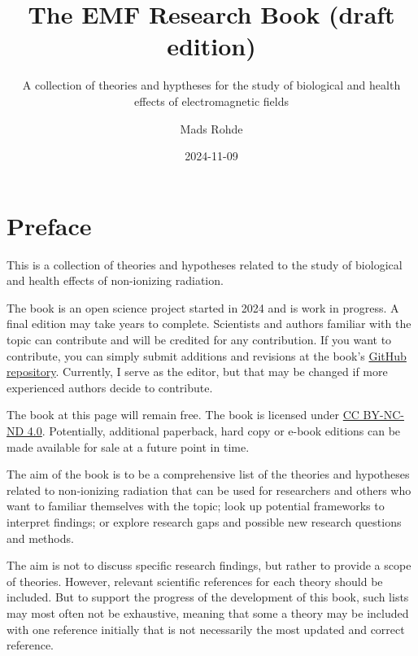 \documentclass[
  letterpaper,
  DIV=11,
  numbers=noendperiod]{scrreprt}
\title{The EMF Research Book (draft edition)}
\subtitle{A collection of theories and hyptheses for the study of
biological and health effects of electromagnetic fields}
\author{Mads Rohde}
\date{2024-11-09}
\renewcommand*\contentsname{Table of contents}
\newcommand\contentsname{Table of contents}
\begin{document}
\maketitle
\ifdefined\Shaded\renewenvironment{Shaded}{\begin{tcolorbox}[enhanced, sharp corners, boxrule=0pt, breakable, borderline west={3pt}{0pt}{shadecolor}, interior hidden, frame hidden]}{\end{tcolorbox}}\fi

\renewcommand*\contentsname{Table of contents}
{
\hypersetup{linkcolor=}
\setcounter{tocdepth}{2}
\tableofcontents
}

\hypertarget{preface}{%
\chapter*{Preface}\label{preface}}


This is a collection of theories and hypotheses related to the study of
biological and health effects of non-ionizing radiation.

The book is an open science project started in 2024 and is work in
progress. A final edition may take years to complete. Scientists and
authors familiar with the topic can contribute and will be credited for
any contribution. If you want to contribute, you can simply submit
additions and revisions at the book's
\href{https://github.com/cortexR/emf-research-book/}{GitHub repository}.
Currently, I serve as the editor, but that may be changed if more
experienced authors decide to contribute.

The book at this page will remain free. The book is licensed under
\href{https://creativecommons.org/licenses/by-nc-nd/4.0/deed.en}{CC
BY-NC-ND 4.0}. Potentially, additional paperback, hard copy or e-book
editions can be made available for sale at a future point in time.

The aim of the book is to be a comprehensive list of the theories and
hypotheses related to non-ionizing radiation that can be used for
researchers and others who want to familiar themselves with the topic;
look up potential frameworks to interpret findings; or explore research
gaps and possible new research questions and methods.

The aim is not to discuss specific research findings, but rather to
provide a scope of theories. However, relevant scientific references for
each theory should be included. But to support the progress of the
development of this book, such lists may most often not be exhaustive,
meaning that some a theory may be included with one reference initially
that is not necessarily the most updated and correct reference.
\end{document}

